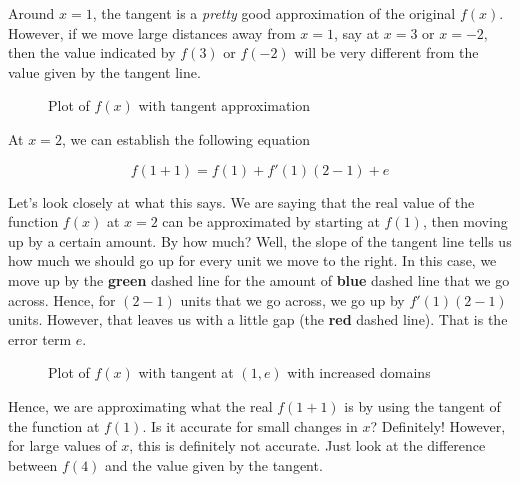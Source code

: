 \documentclass[11pt]{scrartcl}
\begin{document}
Around $x = 1$, the tangent is a \emph{pretty} good approximation of the original $f(x)$. However, if we move large distances away from $x=1$, say at $x=3$ or $x=-2$, then the value indicated by $f(3)$ or $f(-2)$ will be very different from the value given by the tangent line. 

\begin{figure}[ht!]
\centering
{}
\caption{Plot of $f(x)$ with tangent approximation}
\end{figure}

At $x=2$, we can establish the following equation

\[f(1+1) = f(1) + f ' (1)(2-1) + e \] 

Let's look closely at what this says. We are saying that the real value of the function $f(x)$ at $x=2$ can be approximated by starting at $f(1)$, then moving up by a certain amount. By how much? Well, the slope of the tangent line tells us how much we should go up for every unit we move to the right. In this case, we move up by the \textbf{green} dashed line for the amount of \textbf{blue} dashed line that we go across. Hence, for $(2-1)$ units that we go across, we go up by $f ' (1)(2-1)$ units. However, that leaves us with a little gap (the \textbf{red} dashed line). That is the error term $e$.

\begin{figure}[ht!]
\centering
{}
\caption{Plot of $f(x)$ with tangent at $(1, e)$ with increased domains}
\end{figure}

Hence, we are approximating what the real $f(1+1)$ is by using the tangent of the function at $f(1)$. Is it accurate for small changes in $x$? Definitely! However, for large values of $x$, this is definitely not accurate. Just look at the difference between $f(4)$ and the value given by the tangent.
\end{document}

